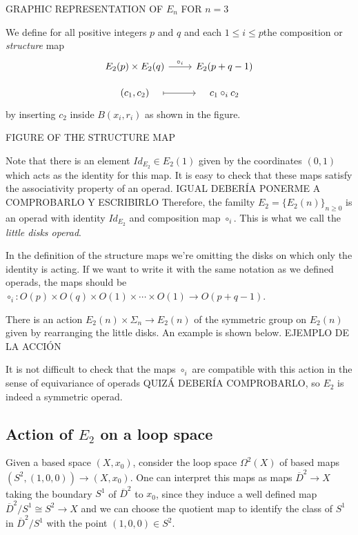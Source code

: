 \documentclass[TFM.tex]{subfiles}
\begin{document}
 
 GRAPHIC REPRESENTATION OF $E_n$ FOR $n=3$
 
 We define for all positive integers $p$ and $q$ and  each $1\leq i\leq p$the composition or \emph{structure} map 
 \[
 \begin{tikzcd}[row sep=10]
  E_2(p)\times E_2(q)\arrow[r, "\circ_i"] & E_2(p+q-1)\\
  (c_1,c_2)\arrow[r, mapsto, shorten <= 1em, shorten >= 1em] & c_1\circ_i c_2
 \end{tikzcd}
 \]
 by inserting $c_2$ inside $B(x_i,r_i)$ as shown in the figure. 
 
 FIGURE OF THE STRUCTURE MAP


Note that there is an element $Id_{E_2}\in E_2(1)$ given by the coordinates $(0,1)$ which acts as the identity for this map. It is easy to check that these maps satisfy the associativity property of an operad. IGUAL DEBERÍA PONERME A COMPROBARLO Y ESCRIBIRLO Therefore, the familty $E_2=\{E_2(n)\}_{n\geq 0}$ is an operad with identity $Id_{E_2}$ and composition map $\circ_i$. This is what we call the \emph{little disks operad}.

\begin{remark}
In the definition of the structure maps we're omitting the disks on which only the identity is acting. If we want to write it with the same notation as we defined operads, the maps should be $\circ_i:O(p)\times O(q)\times O(1)\times\cdots \times O(1)\to O(p+q-1)$. 
\end{remark}

There is an action $E_2(n)\times \Sigma_n\to E_2(n)$ of the symmetric group on $E_2(n)$ given by rearranging the little disks. An example is shown below.
EJEMPLO DE LA ACCIÓN

It is not difficult to check that the maps $\circ_i$ are compatible with this action in the sense of equivariance of operads QUIZÁ DEBERÍA COMPROBARLO, so $E_2$ is indeed a symmetric operad. 

\subsection{Action of $E_2$ on a loop space}
Given a based space $(X,x_0)$, consider the loop space $\Omega^2(X)$ of based maps $(S^2, (1,0,0))\to (X, x_0)$. One can interpret this maps as maps $\overline{D}^2\to X$ taking the boundary $S^1$ of $\overline{D}^2$ to $x_0$, since they induce a well defined map $\overline{D}^2/S^1\cong S^2\to X$ and we can choose the quotient map to identify the class of $S^1$ in $\overline{D}^2/S^1$ with the point $(1,0,0)\in S^2$. 
\end{document}
